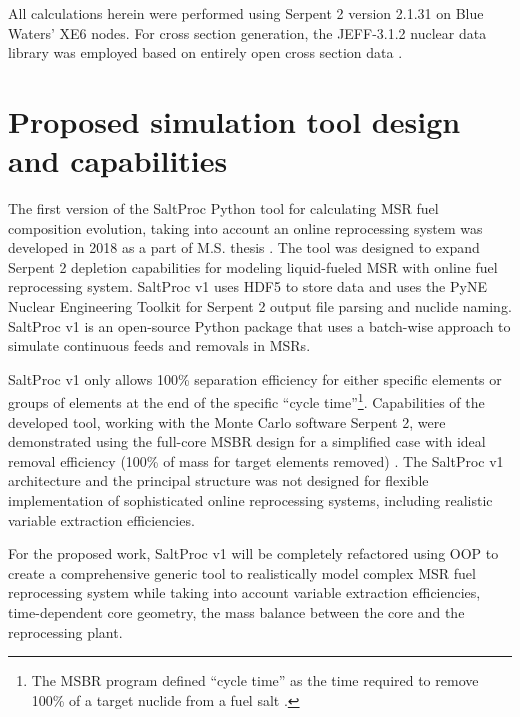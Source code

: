 All calculations herein were performed using Serpent 2 version 2.1.31 on Blue 
Waters’ XE6 nodes. For cross section generation, the JEFF-3.1.2 nuclear data 
library was employed based on entirely open cross section data 
\cite{oecd/nea_jeff-3.1.2_2014}. 

\section{Proposed simulation tool design and capabilities} 
\label{sec:tool_design}
The first version of the SaltProc Python tool for calculating \gls{MSR} fuel 
composition evolution, taking into account an online reprocessing system 
was developed in 2018 as a part of M.S. thesis \cite{rykhlevskii_advanced_2018,
	rykhlevskii_arfc/saltproc_2018}. The tool was designed to 
expand Serpent 2 depletion capabilities for modeling liquid-fueled \gls{MSR} 
with online fuel reprocessing system. SaltProc v1 uses HDF5 
\cite{the_hdf_group_hierarchical_1997} to store 
data and uses the PyNE Nuclear Engineering Toolkit \cite{scopatz_pyne_2012}
for Serpent 2 output file parsing and nuclide naming. SaltProc v1 is an 
open-source Python package that uses a batch-wise approach to simulate 
continuous feeds and removals in \glspl{MSR}. 

SaltProc v1 only allows 100\% separation efficiency for either specific 
elements or groups of elements at the end of the specific ``cycle 
time''\footnote{The \gls{MSBR} program defined ``cycle time'' as the time 
required to remove 100\% of a target nuclide from a fuel salt 
\cite{robertson_conceptual_1971}.}. Capabilities of the developed tool, 
working with the Monte Carlo software Serpent 2, were demonstrated using the 
full-core MSBR design for a simplified case with ideal removal efficiency 
(100\% of mass for target elements removed) \cite{rykhlevskii_modeling_2019}. 
The SaltProc v1 architecture and the principal structure was not designed for 
flexible implementation of sophisticated online reprocessing systems, 
including realistic variable extraction efficiencies. 

For the proposed work, SaltProc v1 will be completely refactored using 
\gls{OOP} to create a comprehensive generic tool to realistically model 
complex \gls{MSR} fuel reprocessing system while taking into account 
variable extraction efficiencies, time-dependent core geometry, the mass 
balance between the core and the reprocessing plant.

